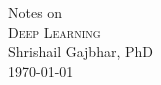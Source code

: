 \begin{titlepage}
	\centering
	{\large Notes on\\}
	{\Huge\scshape Deep Learning\\[1in]}
	{\Large Shrishail Gajbhar, PhD\\[.2in]}
	\vfill
	\today
\end{titlepage}
